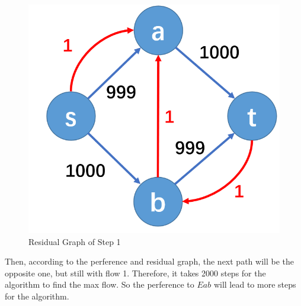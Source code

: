 \documentclass[a4paper]{article}
\begin{document}
\begin{figure}[H]
    \centering
    \includegraphics[scale=0.25]{P8.png}
    \caption{Residual Graph of Step 1}
\end{figure}
Then, according to the perference and residual graph, the next path will be the opposite one, but still with flow 1. Therefore, it takes 2000 steps for the algorithm to find the max flow. So the perference to $E{ab}$ will lead to more steps for the algorithm.
\end{document}
